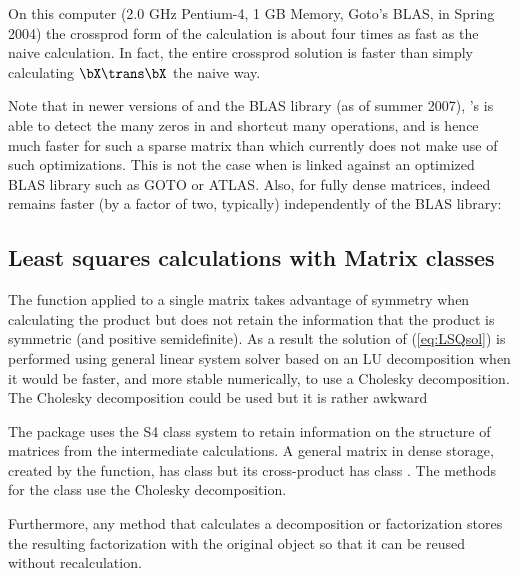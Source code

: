 On this computer (2.0 GHz Pentium-4, 1 GB Memory, Goto's BLAS, in Spring
2004) the
crossprod form of the calculation is about four times as fast as the
naive calculation.  In fact, the entire crossprod solution is
faster than simply calculating $\bX\trans\bX$ the naive way.

\Rcodeplaceholder{}

Note that in newer versions of \RR{} and the BLAS library (as of summer
2007), \RR's \code{\%*\%} is able to detect the many zeros in  and
shortcut many operations, and is hence much faster for such a sparse matrix
than  which currently does not make use of such
optimizations.  This is not the case when \RR{} is linked against an
optimized BLAS library such as GOTO or ATLAS.
Also, for fully dense matrices,  indeed remains faster
(by a factor of two, typically) independently of the BLAS library:

\Rcodeplaceholder{}



\subsection{Least squares calculations with Matrix classes}
\label{sec:MatrixLSQ}

The  function applied to a single matrix takes
advantage of symmetry when calculating the product but does not retain
the information that the product is symmetric (and positive
semidefinite).  As a result the solution of (\ref{eq:LSQsol}) is
performed using general linear system solver based on an LU
decomposition when it would be faster, and more stable numerically, to
use a Cholesky decomposition.  The Cholesky decomposition could be used
but it is rather awkward

\Rcodeplaceholder{}

The  package uses the S4 class system
\citep{R:Chambers:1998} to retain information on the structure of
matrices from the intermediate calculations.  A general matrix in
dense storage, created by the  function, has class
 but its cross-product has class .
The  methods for the  class use the
Cholesky decomposition.

\Rcodeplaceholder{}

Furthermore, any method that calculates a
decomposition or factorization stores the resulting factorization with
the original object so that it can be reused without recalculation.


